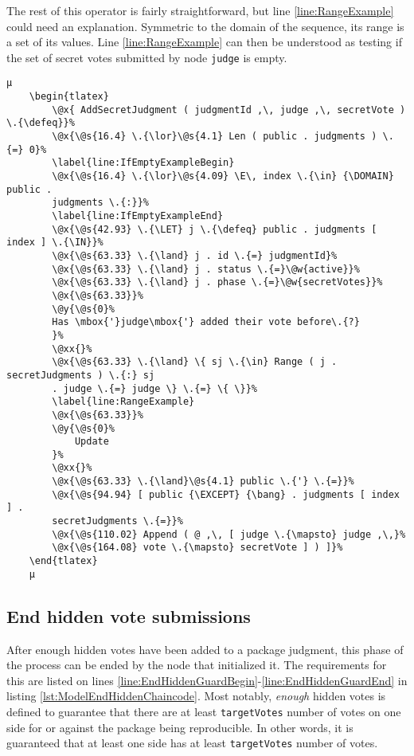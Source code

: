 The rest of this operator is fairly straightforward, but line \ref{line:RangeExample} could need an explanation. Symmetric to the domain of the sequence, its range is a set of its values. Line \ref{line:RangeExample} can then be understood as testing if the set of secret votes submitted by node \texttt{judge} is empty.

\begin{lstlisting}[caption=Chaincode for adding a hidden vote, label=lst:ModelSubmitHiddenChaincode]
	µ
	\begin{tlatex}
        \@x{ AddSecretJudgment ( judgmentId ,\, judge ,\, secretVote ) \.{\defeq}}%
        \@x{\@s{16.4} \.{\lor}\@s{4.1} Len ( public . judgments ) \.{=} 0}%
        \label{line:IfEmptyExampleBegin}
        \@x{\@s{16.4} \.{\lor}\@s{4.09} \E\, index \.{\in} {\DOMAIN} public .
        judgments \.{:}}%
        \label{line:IfEmptyExampleEnd}
        \@x{\@s{42.93} \.{\LET} j \.{\defeq} public . judgments [ index ] \.{\IN}}%
        \@x{\@s{63.33} \.{\land} j . id \.{=} judgmentId}%
        \@x{\@s{63.33} \.{\land} j . status \.{=}\@w{active}}%
        \@x{\@s{63.33} \.{\land} j . phase \.{=}\@w{secretVotes}}%
        \@x{\@s{63.33}}%
        \@y{\@s{0}%
        Has \mbox{'}judge\mbox{'} added their vote before\.{?}
        }%
        \@xx{}%
        \@x{\@s{63.33} \.{\land} \{ sj \.{\in} Range ( j . secretJudgments ) \.{:} sj
        . judge \.{=} judge \} \.{=} \{ \}}%
        \label{line:RangeExample}
        \@x{\@s{63.33}}%
        \@y{\@s{0}%
            Update
        }%
        \@xx{}%
        \@x{\@s{63.33} \.{\land}\@s{4.1} public \.{'} \.{=}}%
        \@x{\@s{94.94} [ public {\EXCEPT} {\bang} . judgments [ index ] .
        secretJudgments \.{=}}%
        \@x{\@s{110.02} Append ( @ ,\, [ judge \.{\mapsto} judge ,\,}%
        \@x{\@s{164.08} vote \.{\mapsto} secretVote ] ) ]}%
    \end{tlatex}
    µ
\end{lstlisting}

\subsection{End hidden vote submissions}
\label{subsec:ModelEndHiddenChaincode}

After enough hidden votes have been added to a package judgment, this phase of the process can be ended by the node that initialized it. The requirements for this are listed on lines \ref{line:EndHiddenGuardBegin}-\ref{line:EndHiddenGuardEnd} in listing \ref{lst:ModelEndHiddenChaincode}. Most notably, \emph{enough} hidden votes is defined to guarantee that there are at least \texttt{targetVotes} number of votes on one side for or against the package being reproducible. In other words, it is guaranteed that at least one side has at least \texttt{targetVotes} number of votes.

